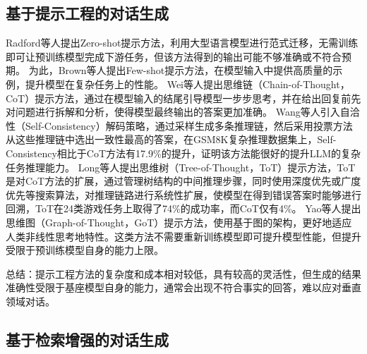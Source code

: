 \subsection{基于提示工程的对话生成}

Radford等人\cite{radford2019language}提出Zero-shot提示方法，利用大型语言模型进行范式迁移，无需训练即可让预训练模型完成下游任务，但该方法得到的输出可能不够准确或不符合预期。
为此，Brown等人\cite{DBLP:conf/nips/BrownMRSKDNSSAA20}提出Few-shot提示方法，在模型输入中提供高质量的示例，提升模型在复杂任务上的性能。
Wei等人\cite{DBLP:conf/nips/Wei0SBIXCLZ22}提出思维链（Chain-of-Thought，CoT）提示方法，通过在模型输入的结尾引导模型一步步思考，并在给出回复前先对问题进行拆解和分析，使得模型最终输出的答案更加准确。
Wang等人\cite{DBLP:conf/iclr/0002WSLCNCZ23}引入自洽性（Self-Consistency）解码策略，通过采样生成多条推理链，然后采用投票方法从这些推理链中选出一致性最高的答案，在GSM8K复杂推理数据集上，Self-Consistency相比于CoT方法有17.9\%的提升，证明该方法能很好的提升LLM的复杂任务推理能力。
Long等人\cite{DBLP:journals/corr/abs-2305-08291}提出思维树（Tree-of-Thought，ToT）提示方法，ToT是对CoT方法的扩展，通过管理树结构的中间推理步骤，同时使用深度优先或广度优先等搜索算法，对推理链路进行系统性扩展，使模型在得到错误答案时能够进行回溯，ToT在24类游戏任务上取得了74\%的成功率，而CoT仅有4\%。
Yao等人\cite{DBLP:journals/corr/abs-2305-16582}提出思维图（Graph-of-Thought，GoT）提示方法，使用基于图的架构，更好地适应人类非线性思考地特性。这类方法不需要重新训练模型即可提升模型性能，但提升受限于预训练模型自身的能力上限。

总结：提示工程方法的复杂度和成本相对较低，具有较高的灵活性，但生成的结果准确性受限于基座模型自身的能力，通常会出现不符合事实的回答，难以应对垂直领域对话。

\subsection{基于检索增强的对话生成}

